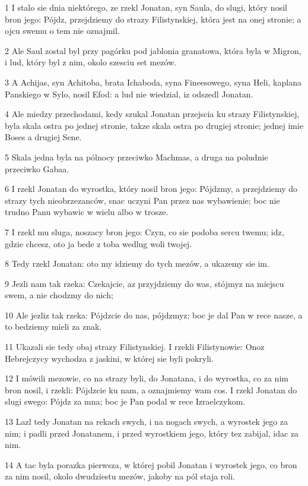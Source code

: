 \par 1 I stalo sie dnia niektórego, ze rzekl Jonatan, syn Saula, do slugi, który nosil bron jego: Pójdz, przejdziemy do strazy Filistynskiej, która jest na onej stronie; a ojcu swemu o tem nie oznajmil.
\par 2 Ale Saul zostal byl przy pagórku pod jablonia granatowa, która byla w Migron, i lud, który byl z nim, okolo szesciu set mezów.
\par 3 A Achijas, syn Achitoba, brata Ichaboda, syna Fineesowego, syna Heli, kaplana Panskiego w Sylo, nosil Efod: a lud nie wiedzial, iz odszedl Jonatan.
\par 4 Ale miedzy przechodami, kedy szukal Jonatan przejscia ku strazy Filistynskiej, byla skala ostra po jednej stronie, takze skala ostra po drugiej stronie; jednej imie Boses a drugiej Sene.
\par 5 Skala jedna byla na pólnocy przeciwko Machmas, a druga na poludnie przeciwko Gabaa.
\par 6 I rzekl Jonatan do wyrostka, który nosil bron jego: Pójdzmy, a przejdziemy do strazy tych nieobrzezanców, snac uczyni Pan przez nas wybawienie; boc nie trudno Panu wybawic w wielu albo w trosze.
\par 7 I rzekl mu sluga, noszacy bron jego: Czyn, co sie podoba sercu twemu; idz, gdzie chcesz, oto ja bede z toba wedlug woli twojej.
\par 8 Tedy rzekl Jonatan: oto my idziemy do tych mezów, a ukazemy sie im.
\par 9 Jezli nam tak rzeka: Czekajcie, az przyjdziemy do was, stójmyz na miejscu swem, a nie chodzmy do nich;
\par 10 Ale jezliz tak rzeka: Pójdzcie do nas, pójdzmyz; boc je dal Pan w rece nasze, a to bedziemy mieli za znak.
\par 11 Ukazali sie tedy obaj strazy Filistynskiej. I rzekli Filistynowie: Onoz Hebrejczycy wychodza z jaskini, w której sie byli pokryli.
\par 12 I mówili mezowie, co na strazy byli, do Jonatana, i do wyrostka, co za nim bron nosil, i rzekli: Pójdzcie ku nam, a oznajmiemy wam cos. I rzekl Jonatan do slugi swego: Pójdz za mna; boc je Pan podal w rece Izraelczykom.
\par 13 Lazl tedy Jonatan na rekach swych, i na nogach swych, a wyrostek jego za nim; i padli przed Jonatanem, i przed wyrostkiem jego, który tez zabijal, idac za nim.
\par 14 A tac byla porazka pierwsza, w której pobil Jonatan i wyrostek jego, co bron za nim nosil, okolo dwudziestu mezów, jakoby na pól staja roli.
